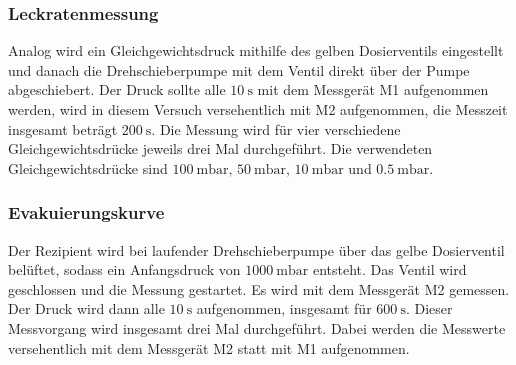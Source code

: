             \subsubsection{Leckratenmessung}
                Analog wird ein Gleichgewichtsdruck mithilfe des gelben Dosierventils eingestellt und danach die Drehschieberpumpe mit dem Ventil direkt über der Pumpe abgeschiebert.
                Der Druck sollte alle $\SI{10}{\second}$ mit dem Messgerät M1 aufgenommen werden, wird in diesem Versuch versehentlich mit M2 aufgenommen, die Messzeit insgesamt beträgt $\SI{200}{\second}$.
                Die Messung wird für vier verschiedene Gleichgewichtsdrücke jeweils drei Mal durchgeführt.
                Die verwendeten Gleichgewichtsdrücke sind $\SI{100}{\milli\bar},\, \SI{50}{\milli\bar},\, \SI{10}{\milli\bar}$ und $\SI{0.5}{\milli\bar}$.
            \subsubsection{Evakuierungskurve}
                Der Rezipient wird bei laufender Drehschieberpumpe über das gelbe Dosierventil belüftet, sodass ein Anfangsdruck von $\SI{1000}{\milli\bar}$ entsteht.
                Das Ventil wird geschlossen und die Messung gestartet. Es wird mit dem Messgerät M2 gemessen.
                Der Druck wird dann alle $\SI{10}{\second}$ aufgenommen, insgesamt für $\SI{600}{\second}$.
                Dieser Messvorgang wird insgesamt drei Mal durchgeführt.
                Dabei werden die Messwerte versehentlich mit dem Messgerät M2 statt mit M1 aufgenommen.